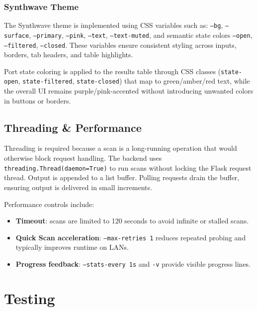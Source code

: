 \documentclass[12pt, a4paper]{report}
\begin{document}
\subsection{Synthwave Theme}
The Synthwave theme is implemented using CSS variables such as:
\texttt{--bg}, \texttt{--surface}, \texttt{--primary}, \texttt{--pink}, \texttt{--text}, \texttt{--text-muted}, and semantic state colors \texttt{--open}, \texttt{--filtered}, \texttt{--closed}. These variables ensure consistent styling across inputs, borders, tab headers, and table highlights.

Port state coloring is applied to the results table through CSS classes (\texttt{state-open}, \texttt{state-filtered}, \texttt{state-closed}) that map to green/amber/red text, while the overall UI remains purple/pink-accented without introducing unwanted colors in buttons or borders.

\section{Threading \& Performance}
Threading is required because a scan is a long-running operation that would otherwise block request handling. The backend uses \texttt{threading.Thread(daemon=True)} to run scans without locking the Flask request thread. Output is appended to a list buffer. Polling requests drain the buffer, ensuring output is delivered in small increments.

Performance controls include:
\begin{itemize}[leftmargin=2.2em]
  \item \textbf{Timeout}: scans are limited to 120 seconds to avoid infinite or stalled scans.
  \item \textbf{Quick Scan acceleration}: \texttt{--max-retries 1} reduces repeated probing and typically improves runtime on LANs.
  \item \textbf{Progress feedback}: \texttt{--stats-every 1s} and \texttt{-v} provide visible progress lines.
\end{itemize}

\clearpage
\chapter{Testing}
\end{document}
